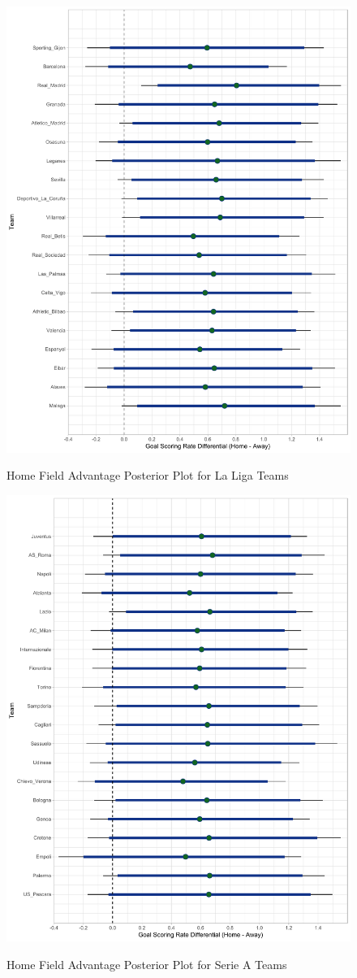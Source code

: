 \documentclass[USenglish]{article}
\begin{document}
\begin{figure}
\caption{Home Field Advantage Posterior Plot for La Liga Teams}
{\includegraphics[width=0.90\linewidth]{HFA_La_Liga11.pdf}}
\label{fig3}
\end{figure}


\begin{figure}
\caption{Home Field Advantage Posterior Plot for Serie A Teams}
{\includegraphics[width=0.90\linewidth]{HFA_Serie_A11.pdf}}
\label{fig4}
\end{figure}
\end{document}
